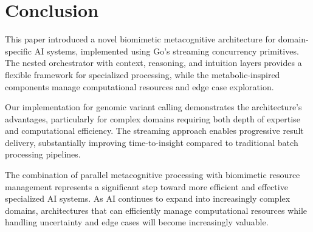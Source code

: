 \documentclass[11pt,a4paper,twocolumn]{article}
\begin{document}
\section{Conclusion}

This paper introduced a novel biomimetic metacognitive architecture for domain-specific AI systems, implemented using Go's streaming concurrency primitives. The nested orchestrator with context, reasoning, and intuition layers provides a flexible framework for specialized processing, while the metabolic-inspired components manage computational resources and edge case exploration.

Our implementation for genomic variant calling demonstrates the architecture's advantages, particularly for complex domains requiring both depth of expertise and computational efficiency. The streaming approach enables progressive result delivery, substantially improving time-to-insight compared to traditional batch processing pipelines.

The combination of parallel metacognitive processing with biomimetic resource management represents a significant step toward more efficient and effective specialized AI systems. As AI continues to expand into increasingly complex domains, architectures that can efficiently manage computational resources while handling uncertainty and edge cases will become increasingly valuable.
\end{document}
